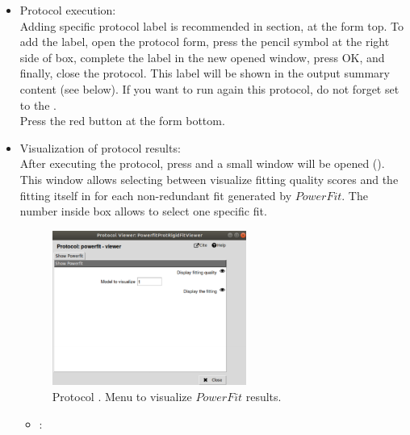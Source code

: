 \begin{itemize}
  \item Protocol execution:\\
  
  Adding specific protocol label is recommended in  section, at the form top. To add the label, open the protocol form, press the pencil symbol at the right side of  box, complete the label in the new opened window, press OK, and finally, close the protocol. This label will be shown in the output summary content (see below). If you want to run again this protocol, do not forget set to  the .\\
  Press the  red button at the form bottom.\\
  
  \item Visualization of protocol results:\\
  
  After executing the protocol, press  and a small window will be opened (). This window allows selecting between visualize fitting quality scores and the fitting itself in \chimera for each non-redundant fit generated by $PowerFit$. The number inside  box allows to select one specific fit.\\
  
  \begin{figure}[H]
    \centering 
    \captionsetup{width=.7\linewidth} 
    \includegraphics[width=0.60\textwidth]{Images_appendix/Fig114.pdf}
    \caption{Protocol . Menu to visualize $PowerFit$ results.}
    \label{fig:app_protocol_powerfit_2}
   \end{figure}
   
   \begin{itemize}
   
    \item {}:\\
    

\end{itemize}
\end{itemize}
